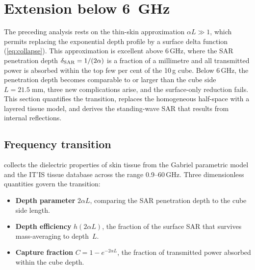 \section{Extension below 6~GHz}
\label{sec:below-6ghz}

The preceding analysis rests on the thin-skin approximation
$\alpha L \gg 1$, which permits replacing the exponential depth profile by
a surface delta function (\cref{eq:collapse}).  This approximation is
excellent above 6\,GHz, where the SAR penetration depth
$\delta_{\mathrm{SAR}} = 1/(2\alpha)$ is a fraction of a millimetre and all
transmitted power is absorbed within the top few per cent of the 10\,g
cube.  Below 6\,GHz, the penetration depth becomes comparable to or larger
than the cube side $L = 21.5\;\mathrm{mm}$, three new complications arise,
and the surface-only reduction fails.  This section quantifies the
transition, replaces the homogeneous half-space with a layered tissue
model, and derives the standing-wave SAR that results from internal
reflections.


\subsection{Frequency transition}
\label{sec:freq-transition}

 collects the dielectric properties of skin tissue
from the Gabriel parametric model \cite{Gabriel1996} and the IT'IS tissue
database across the range 0.9--60\,GHz.  Three dimensionless quantities
govern the transition:

\begin{itemize}[nosep]
\item \textbf{Depth parameter} $2\alpha L$, comparing the SAR penetration
  depth to the cube side length.
\item \textbf{Depth efficiency} $h(2\alpha L)$, the fraction of the
  surface SAR that survives mass-averaging to depth~$L$.
\item \textbf{Capture fraction} $C = 1 - e^{-2\alpha L}$, the fraction of
  transmitted power absorbed within the cube depth.
\end{itemize}

